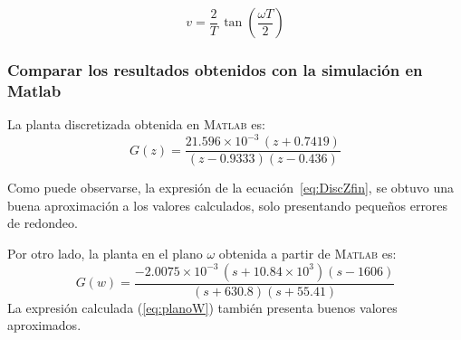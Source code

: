 \begin{equation}
	v = \frac{2}{T}\,\tan\!\left(\frac{\omega T}{2}\right)
\end{equation}

\subsubsection{Comparar los resultados obtenidos con la simulación en Matlab}

La planta discretizada obtenida en \textsc{Matlab} es:
\[
G(z) = \frac{21.596 \times 10^{-3}\,(z + 0.7419)}{(z - 0.9333)(z - 0.436)} 
\]

Como puede observarse, la expresión de la ecuación~\ref{eq:DiscZfin}, se obtuvo una buena aproximación a los valores calculados, solo presentando pequeños errores de redondeo.

Por otro lado, la planta en el plano $\mathcal{\omega}$ obtenida a partir de \textsc{Matlab} es:
\[
G(w) = \frac{-2.0075 \times 10^{-3}\,(s + 10.84 \times 10^{3})(s - 1606)}{(s + 630.8)(s + 55.41)} 
\]
La expresión calculada (\ref{eq:planoW}) también presenta buenos valores aproximados.



